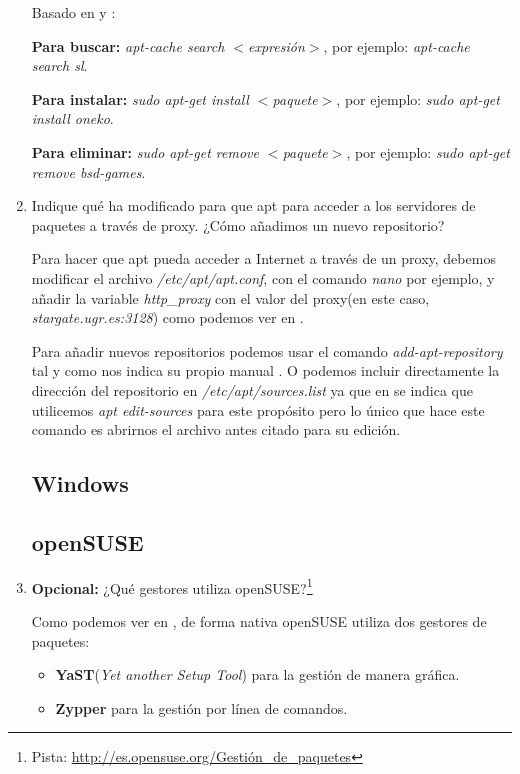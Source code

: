 \documentclass[paper=a4, fontsize=11pt]{scrartcl} %
\numberwithin{equation}{section} %
\numberwithin{figure}{section} %
\numberwithin{table}{section} %
\begin{document}
\begin{enumerate}
		Basado en \cite{man_apt-cache} y \cite{man_apt-get}:
		
		\textbf{Para buscar:} \textit{apt-cache search $<$expresión$>$}, por ejemplo: \textit{apt-cache
		search sl}.
		
		\textbf{Para instalar:} \textit{sudo apt-get install $<$paquete$>$}, por ejemplo: \textit{sudo
		apt-get install oneko}.
		
		\textbf{Para eliminar:} \textit{sudo apt-get remove $<$paquete$>$}, por ejemplo: \textit{sudo
		apt-get remove bsd-games}.
		
		
		\item Indique qué ha modificado para que apt para acceder a los servidores de paquetes a través
		de proxy. ¿Cómo añadimos un nuevo repositorio?
		
		Para hacer que apt pueda acceder a Internet a través de un proxy, debemos modificar el archivo
		\textit{/etc/apt/apt.conf}, con el comando \textit{nano} por ejemplo, y añadir la variable
		\textit{http\_proxy} con el valor del proxy(en este caso, \textit{stargate.ugr.es:3128}) como
		podemos ver en \cite{man_apt.conf}.
		
		Para añadir nuevos repositorios podemos usar el comando \textit{add-apt-repository} tal y como
		nos indica su propio manual \cite{man_add-apt-repository}. O podemos incluir directamente la
		dirección del repositorio en \textit{/etc/apt/sources.list} ya que en \cite{man_apt} se indica
		que utilicemos \textit{apt edit-sources} para este propósito pero lo único que hace este comando
		es abrirnos el archivo antes citado para su edición.
	
	\subsection{Windows}
	\subsection{openSUSE}
		\item \textbf{Opcional:} ¿Qué gestores utiliza openSUSE?\footnote{Pista:
		\url{http://es.opensuse.org/Gestión_de_paquetes}}
		
		Como podemos ver en \cite{oS_packman}, de forma nativa openSUSE utiliza dos gestores de paquetes:
		
		\begin{itemize}
			\item \textbf{YaST}\cite{oS_YaST}(\textit{Yet another Setup Tool}) para la gestión de manera
			gráfica.
			\item \textbf{Zypper}\cite{oS_zypper} para la gestión por línea de comandos.
		\end{itemize}
		

\end{enumerate}
\end{document}
